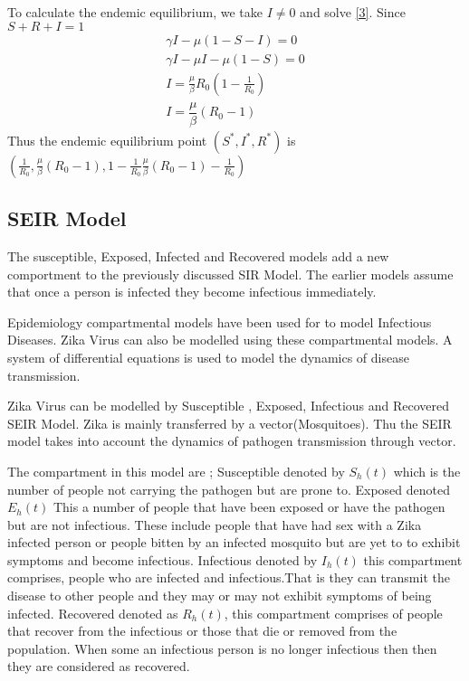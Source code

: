  To calculate the endemic equilibrium, we take $I \neq  0 $ and solve \eqref{3}. Since $S+R+I =1$
 \begin{align}
 \gamma I - \mu (1 -S -I) = 0
 \\ \gamma I - \mu I -\mu (1-S) = 0
 \\ I = \frac{\mu}{\beta} R_0 \left( 1- \frac{1}{R_0} \right)
 \\ I = \dfrac{\mu}{\beta} (R_0 -1) 
 \end{align}
 Thus the endemic equilibrium point $( S^*,I^*,R^*)$ is 
$\left( \frac{1}{R_0}, \frac{\mu}{\beta} (R_0 -1), 1 -  \frac{1}{R_0} \frac{\mu}{\beta} (R_0 -1) - \frac{1}{R_0} \right)$
 
 \subsection{SEIR Model}
The susceptible, Exposed, Infected and Recovered models add a new comportment to the previously discussed SIR Model. The earlier models assume that once a person is infected they become infectious immediately. 


Epidemiology compartmental models have been used for to model Infectious Diseases. Zika Virus can also be modelled using these compartmental models. A system of differential equations is used to model the dynamics of disease transmission.

Zika Virus can be modelled by Susceptible , Exposed, Infectious and Recovered SEIR Model. Zika is mainly transferred by a vector(Mosquitoes). Thu the SEIR model takes into account the dynamics of pathogen transmission through vector.

The compartment in this model are ; Susceptible denoted by $S_h(t)$ which is the number of people not carrying the pathogen but are prone to. Exposed denoted $E_h(t)$ This a number of people that have been exposed or have the pathogen but are not infectious. These include people that have had sex with a Zika infected person or people bitten by an infected mosquito but are yet to to exhibit symptoms and become infectious. Infectious denoted by $I_h(t)$ this compartment  comprises, people who are infected and infectious.That is they can transmit the disease to other people and they may or may not exhibit symptoms of being infected. Recovered denoted as $R_h(t)$, this compartment comprises of people that recover from the infectious or those that die or removed from the population. When some an infectious person is no longer infectious then then they are considered as recovered.

